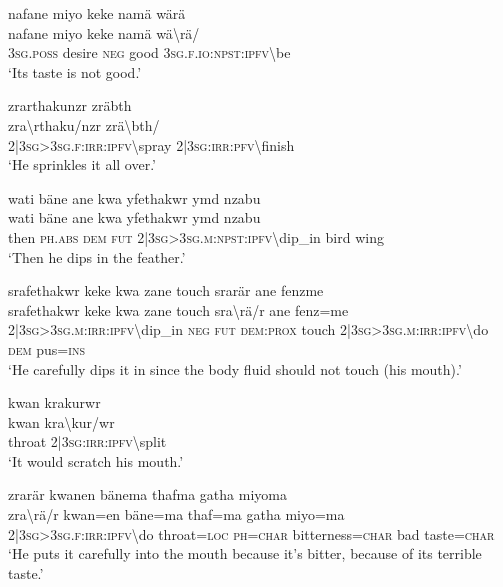 \ea\label{ex:a4315}
nafane miyo keke namä wärä\\
\gll nafane	miyo	keke	namä	wä{\textbackslash}rä/\\
     3\textsc{sg}.\textsc{poss}	desire	\textsc{neg}	good	3\textsc{sg}.\textsc{f}.\textsc{io}:\textsc{npst}:\textsc{ipfv}{\textbackslash}be\\
\glt `Its taste is not good.'
\z

\ea\label{ex:a4316}
zrarthakunzr zräbth\\
\gll zra{\textbackslash}rthaku/nzr	zrä{\textbackslash}bth/\\
     2|3\textsc{sg}>3\textsc{sg}.\textsc{f}:\textsc{irr}:\textsc{ipfv}{\textbackslash}spray	2|3\textsc{sg}:\textsc{irr}:\textsc{pfv}{\textbackslash}finish\\
\glt `He sprinkles it all over.'
\z

\ea\label{ex:a4317}
wati bäne ane kwa yfethakwr ymd nzabu\\
\gll wati	bäne	ane	kwa	yfethakwr	ymd	nzabu\\
     then	\textsc{ph}.\textsc{abs}	\textsc{dem}	\textsc{fut}	2|3\textsc{sg}>3\textsc{sg}.\textsc{m}:\textsc{npst}:\textsc{ipfv}{\textbackslash}dip\_in	bird	wing\\
\glt `Then he dips in the feather.'
\z

\ea\label{ex:a4319}
srafethakwr keke kwa zane touch srarär ane fenzme\\
\gll srafethakwr	keke	kwa	zane	touch	sra{\textbackslash}rä/r	ane	fenz=me\\
     2|3\textsc{sg}>3\textsc{sg}.\textsc{m}:\textsc{irr}:\textsc{ipfv}{\textbackslash}dip\_in	\textsc{neg}	\textsc{fut}	\textsc{dem}:\textsc{prox}	touch	2|3\textsc{sg}>3\textsc{sg}.\textsc{m}:\textsc{irr}:\textsc{ipfv}{\textbackslash}do	\textsc{dem}	pus=\textsc{ins}\\
\glt `He carefully dips it in since the body fluid should not touch (his mouth).'
\z

\ea\label{ex:a4320}
kwan krakurwr\\
\gll kwan	kra{\textbackslash}kur/wr\\
     throat	2|3\textsc{sg}:\textsc{irr}:\textsc{ipfv}{\textbackslash}split\\
\glt `It would scratch his mouth.'
\z

\ea\label{ex:a4321}
zrarär kwanen  bänema thafma gatha miyoma\\
\gll zra{\textbackslash}rä/r	kwan=en	bäne=ma	thaf=ma	gatha	miyo=ma\\
     2|3\textsc{sg}>3\textsc{sg}.\textsc{f}:\textsc{irr}:\textsc{ipfv}{\textbackslash}do	throat=\textsc{loc}	\textsc{ph}=\textsc{char}	bitterness=\textsc{char}	bad	taste=\textsc{char}\\
\glt `He puts it carefully into the mouth because it's bitter, because of its terrible taste.'
\z


